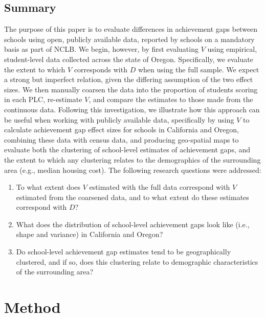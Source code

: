 \documentclass[man, fleqn, noextraspace]{apa6}
\providecommand{\tightlist}{%
  \setlength{\itemsep}{0pt}\setlength{\parskip}{0pt}}
\theoremstyle{definition}
\theoremstyle{definition}
\theoremstyle{definition}
\theoremstyle{remark}
\begin{document}
\hypertarget{summary}{%
\subsection{Summary}\label{summary}}

The purpose of this paper is to evaluate differences in achievement gaps
between schools using open, publicly available data, reported by schools
on a mandatory basis as part of NCLB. We begin, however, by first
evaluating \(V\) using empirical, student-level data collected across
the state of Oregon. Specifically, we evaluate the extent to which \(V\)
corresponds with \(D\) when using the full sample. We expect a strong
but imperfect relation, given the differing assumption of the two effect
sizes. We then manually coarsen the data into the proportion of students
scoring in each PLC, re-estimate \(V\), and compare the estimates to
those made from the continuous data. Following this investigation, we
illustrate how this approach can be useful when working with publicly
available data, specifically by using \(V\) to calculate achievement gap
effect sizes for schools in California and Oregon, combining these data
with census data, and producing geo-spatial maps to evaluate both the
clustering of school-level estimates of achievement gaps, and the extent
to which any clustering relates to the demographics of the surrounding
area (e.g., median housing cost). The following research questions were
addressed:

\begin{enumerate}
\def\labelenumi{\arabic{enumi}.}
\tightlist
\item
  To what extent does \(V\) estimated with the full data correspond with
  \(V\) estimated from the coarsened data, and to what extent do these
  estimates correspond with \(D\)?
\item
  What does the distribution of school-level achievement gaps look like
  (i.e., shape and variance) in California and Oregon?
\item
  Do school-level achievement gap estimates tend to be geographically
  clustered, and if so, does this clustering relate to demographic
  characteristics of the surrounding area?
\end{enumerate}

\hypertarget{method}{%
\section{Method}\label{method}}
\end{document}

